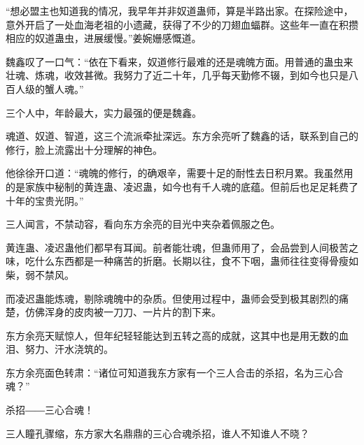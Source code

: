 \begin{this_body}
“想必盟主也知道我的情况，我早年并非奴道蛊师，算是半路出家。在探险途中，意外开启了一处血海老祖的小遗藏，获得了不少的刀翅血蝠群。这些年一直在积攒相应的奴道蛊虫，进展缓慢。”姜婉姗感慨道。

魏鑫叹了一口气：“依在下看来，奴道修行最难的还是魂魄方面。用普通的蛊虫来壮魂、炼魂，收效甚微。我努力了近二十年，几乎每天勤修不辍，到如今也只是八百人级的蟹人魂。”

三个人中，年龄最大，实力最强的便是魏鑫。

魂道、奴道、智道，这三个流派牵扯深远。东方余亮听了魏鑫的话，联系到自己的修行，脸上流露出十分理解的神色。

他徐徐开口道：“魂魄的修行，的确艰辛，需要十足的耐性去日积月累。我虽然用的是家族中秘制的黄连蛊、凌迟蛊，如今也有千人魂的底蕴。但前后也足足耗费了十年的宝贵光阴。”

三人闻言，不禁动容，看向东方余亮的目光中夹杂着佩服之色。

黄连蛊、凌迟蛊他们都早有耳闻。前者能壮魂，但蛊师用了，会品尝到人间极苦之味，吃什么东西都是一种痛苦的折磨。长期以往，食不下咽，蛊师往往变得骨瘦如柴，弱不禁风。

而凌迟蛊能炼魂，剔除魂魄中的杂质。但使用过程中，蛊师会受到极其剧烈的痛楚，仿佛浑身的皮肉被一刀刀、一片片的割下来。

东方余亮天赋惊人，但年纪轻轻能达到五转之高的成就，这其中也是用无数的血泪、努力、汗水浇筑的。

东方余亮面色转肃：“诸位可知道我东方家有一个三人合击的杀招，名为三心合魂？”

杀招――三心合魂！

三人瞳孔骤缩，东方家大名鼎鼎的三心合魂杀招，谁人不知谁人不晓？

\end{this_body}

